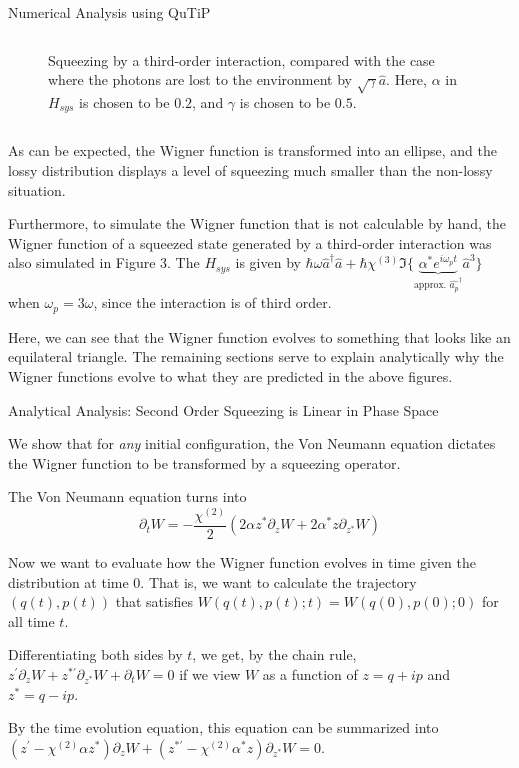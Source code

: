 \documentclass[final]{beamer}
\newlength{\colwidth}
\begin{document}
\begin{frame}[t]
\begin{columns}[t]
\begin{column}{\colwidth}
\begin{block}{Numerical Analysis using QuTiP}
\begin{columns}
\begin{column}{0.5\textwidth}
\begin{figure}
              \caption{Squeezing by a third-order interaction, compared with the case where the photons are lost to the environment by $\sqrt{\gamma}\hat{a}$. Here, $\alpha$ in $H_{sys}$ is chosen to be $0.2$, and $\gamma$ is chosen to be $0.5$.}
            \end{figure}
          \end{column}
        \end{columns}
        As can be expected, the Wigner function is transformed into an ellipse, and the lossy distribution displays a level of squeezing much smaller than the non-lossy situation.

        Furthermore, to simulate the Wigner function that is not calculable by hand, the Wigner function of a squeezed state generated by a third-order interaction was also simulated in Figure 3.
        The $H_{sys}$ is given by $\hbar\omega\hat{a}^{\dag}\hat{a}+\hbar\chi^{(3)}\Im\{\underbrace{\alpha^{*} e^{i\omega_{p}t}}_{\text{approx. }\hat{a_{p}}^{\dag}}\hat{a}^{3}\}$ when $\omega_{p}=3\omega$, since the interaction is of third order.

        Here, we can see that the Wigner function evolves to something that looks like an equilateral triangle.
        The remaining sections serve to explain analytically why the Wigner functions evolve to what they are predicted in the above figures.
      \end{block}
      \begin{block}{Analytical Analysis: Second Order Squeezing is Linear in Phase Space}

        We show that for \textit{any} initial configuration, the Von Neumann equation dictates the Wigner function to be transformed by a squeezing operator.

        The Von Neumann equation turns into
        \[\partial_{t}W=-\frac{\chi^{(2)}}{2}(2\alpha z^{*}\partial_{z}W+2\alpha^{*}z\partial_{z^{*}}W)\]

        Now we want to evaluate how the Wigner function evolves in time given the distribution at time $0$.
        That is, we want to calculate the trajectory $(q(t), p(t))$ that satisfies $W(q(t),p(t);t)=W(q(0),p(0);0)$
        for all time $t$.

        Differentiating both sides by $t$, we get, by the chain rule,
        $z^{\prime}\partial_{z}W+z^{*\prime}\partial_{z^{*}}W+\partial_{t}W=0$
        if we view $W$ as a function of $z=q+ip$ and $z^{*}=q-ip$.

        By the time evolution equation, this equation can be summarized into
        $(z^{\prime}-\chi^{(2)}\alpha z^{*})\partial_{z}W+(z^{*\prime}-\chi^{(2)}\alpha^{*} z)\partial_{z^{*}}W=0$.


\end{block}
\end{column}
\end{columns}
\end{frame}
\end{document}
